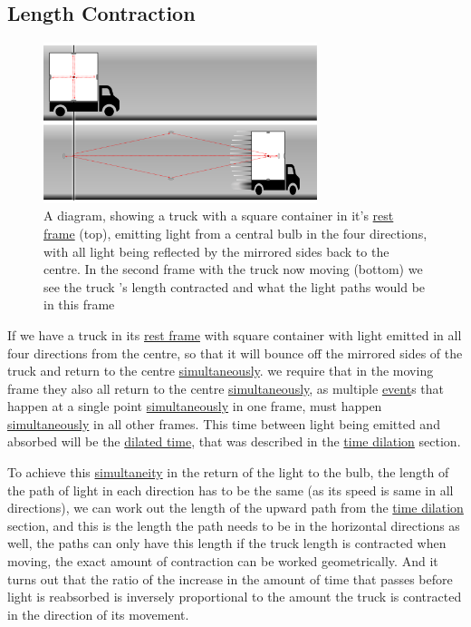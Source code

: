 \subsection{Length Contraction}

\begin{figure}[H]
	\centering
	\includegraphics[width=8cm]{images/pdf/Full_Lorry_Transform.pdf}
	\caption{A diagram, showing a truck with a square container in it's \protect\hyperlink{def-proper-frame}{rest frame} (top), emitting light from a central bulb in the four directions, with all light being reflected by the mirrored sides back to the centre. In the second frame with the truck now moving (bottom) we see the truck 's length contracted and what the light paths would be in this frame}
	\label{fig: full truck transform}
\end{figure}


If we have a truck in its \hyperlink{def-proper-frame}{rest frame} with square container with light emitted in all four directions from the centre, so that it will bounce off the mirrored sides of the truck and return to the centre \hyperlink{def-simultaneity}{simultaneously}. we require that in the moving frame they also all return to the centre \hyperlink{def-simultaneity}{simultaneously}, as multiple \hyperlink{def-event}{event}s that happen at a single point \hyperlink{def-simultaneity}{simultaneously} in one frame, must happen \hyperlink{def-simultaneity}{simultaneously} in all other frames. This time between light being emitted and absorbed will be the \hyperlink{def-time-dilation}{dilated time}, that was described in the \hyperlink{def-time-dilation}{time dilation} section.

To achieve this \hyperlink{def-simultaneity}{simultaneity} in the return of the light to the bulb, the length of the path of light in each direction has to be the same (as its speed is same in all directions), we can work out the length of the upward path from the \hyperlink{def-time-dilation}{time dilation} section, and this is the length the path needs to be in the horizontal directions as well, the paths can only have this length if the truck length is contracted when moving, the exact amount of contraction can be worked geometrically. And it turns out that the ratio of the increase in the amount of time that passes before light is reabsorbed is inversely proportional to the amount the truck is contracted in the direction of its movement.


